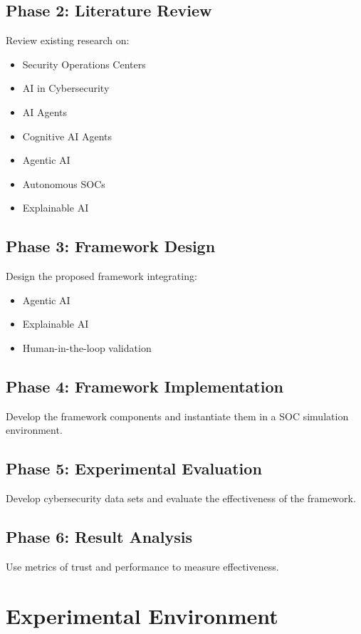 \documentclass[12pt,a4paper]{report}
\begin{document}
\subsection{Phase 2: Literature Review}
Review existing research on:
\begin{itemize}
    \item Security Operations Centers
    \item AI in Cybersecurity
    \item AI Agents
    \item Cognitive AI Agents
    \item Agentic AI
    \item Autonomous SOCs
    \item Explainable AI
\end{itemize}

\subsection{Phase 3: Framework Design}
Design the proposed framework integrating:
\begin{itemize}
    \item Agentic AI
    \item Explainable AI
    \item Human-in-the-loop validation
\end{itemize}

\subsection{Phase 4: Framework Implementation}
Develop the framework components and instantiate them in a SOC simulation environment.

\subsection{Phase 5: Experimental Evaluation}
Develop cybersecurity data sets and evaluate the effectiveness of the framework.

\subsection{Phase 6: Result Analysis}
Use metrics of trust and performance to measure effectiveness.

\section{Experimental Environment}
\label{sec:experimental_env}
\end{document}
